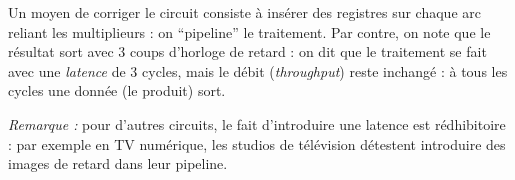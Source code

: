 \documentclass[a4paper,11pt]{article}
\begin{document}
\begin{enumerate}
\begin{solbox}
    Un moyen de corriger le circuit consiste à insérer des registres sur chaque arc reliant les multiplieurs : on ``pipeline'' le traitement. Par contre, on note que le résultat sort avec 3 coups d'horloge de retard : on dit que le traitement se fait avec une \textit{latence} de 3 cycles, mais le débit (\textit{throughput}) reste inchangé : à tous les cycles une donnée (le produit) sort.

    \textit{Remarque :} pour d'autres circuits, le fait d'introduire une latence est rédhibitoire : par exemple en TV numérique, les studios de télévision détestent introduire des images de retard dans leur pipeline.
    \end{solbox}
    \fi
\end{enumerate}
\end{document}
